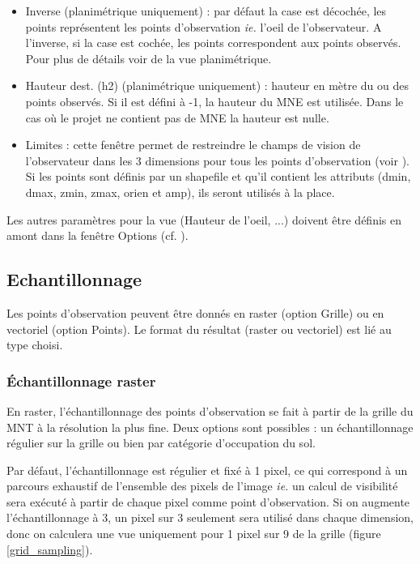 \documentclass{report}
\begin{document}
\begin{itemize}
	\item Inverse (planimétrique uniquement) : par défaut la case est décochée, les points représentent les points d'observation \textit{ie.} l'oeil de l'observateur. A l'inverse, si la case est cochée, les points correspondent aux points observés. Pour plus de détails voir  de la vue planimétrique.
	\item Hauteur dest. (h2) (planimétrique uniquement) : hauteur en mètre du ou des points observés. Si il est défini à -1, la hauteur du MNE est utilisée. Dans le cas où le projet ne contient pas de MNE la hauteur est nulle.
	\item Limites : cette fenêtre permet de restreindre le champs de vision de l'observateur dans les 3 dimensions pour tous les points d'observation (voir ). Si les points sont définis par un shapefile et qu'il contient les attributs (dmin, dmax, zmin, zmax, orien et amp), ils seront utilisés à la place.
\end{itemize}
Les autres paramètres pour la vue (Hauteur de l'oeil, ...) doivent être définis en amont dans la fenêtre Options (cf. ).

\subsection{Echantillonnage}
Les points d'observation peuvent être donnés en raster (option Grille) ou en vectoriel (option Points). Le format du résultat (raster ou vectoriel) est lié au type choisi.

\subsubsection{Échantillonnage raster}
En raster, l'échantillonnage des points d'observation se fait à partir de la grille du MNT à la résolution la plus fine. Deux options sont possibles : un échantillonnage régulier sur la grille ou bien par catégorie d'occupation du sol.

Par défaut, l'échantillonnage est régulier et fixé à 1 pixel, ce qui correspond à un parcours exhaustif de l'ensemble des pixels de l'image \textit{ie.} un calcul de visibilité sera exécuté à partir de chaque pixel comme point d'observation. Si on augmente l'échantillonnage à 3, un pixel sur 3 seulement sera utilisé dans chaque dimension, donc on calculera une vue uniquement pour 1 pixel sur 9 de la grille (figure \ref{grid_sampling}).
\end{document}
